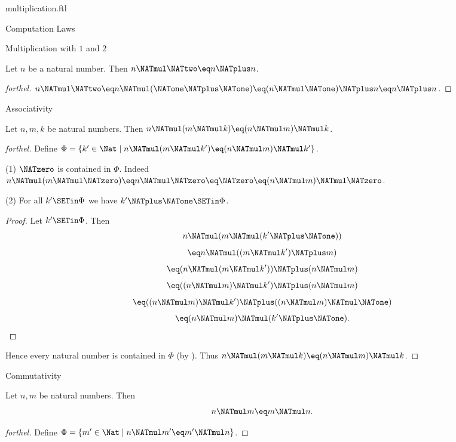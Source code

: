 \documentclass{stex}
\begin{document}
\begin{smodule}{multiplication.ftl}
\begin{sfragment}{Computation Laws}
\begin{sfragment}{Multiplication with $1$ and $2$}
    \begin{corollary}[forthel,id=ARITHMETIC_06_5679541582299136]
      Let $n$ be a natural number.
      Then $n \NATmul \NATtwo \eq n \NATplus n$.
    \end{corollary}
    \begin{proof}[forthel]
      $n \NATmul \NATtwo
        \eq n \NATmul (\NATone \NATplus \NATone)
        \eq (n \NATmul \NATone) \NATplus n
        \eq n \NATplus n$.
    \end{proof}
  \end{sfragment}

  \begin{sfragment}{Associativity}
    \begin{proposition}[forthel,id=ARITHMETIC_06_347295585402880]
      Let $n, m, k$ be natural numbers.
      Then $n \NATmul (m \NATmul k) \eq (n \NATmul m) \NATmul k$.
    \end{proposition}
    \begin{proof}[forthel]
      Define $\Phi = \{ k' \in \Nat \mid n \NATmul (m \NATmul k') \eq (n \NATmul m) \NATmul k' \}$.

      (1) $\NATzero$ is contained in $\Phi$.
      Indeed $n \NATmul (m \NATmul \NATzero)
        \eq n \NATmul \NATzero
        \eq \NATzero
        \eq (n \NATmul m) \NATmul \NATzero$.

      (2) For all $k' \SETin \Phi$ we have $k' \NATplus \NATone \SETin \Phi$.
      \begin{proof}
        Let $k' \SETin \Phi$.
        Then
        \[  n \NATmul (m \NATmul (k' \NATplus \NATone))                          \]
        \[    \eq n \NATmul ((m \NATmul k') \NATplus m)                      \]
        \[    \eq (n \NATmul (m \NATmul k')) \NATplus (n \NATmul m)            \]
        \[    \eq ((n \NATmul m) \NATmul k') \NATplus (n \NATmul m)            \]
        \[    \eq ((n \NATmul m) \NATmul k') \NATplus ((n \NATmul m) \NATmul \NATone)  \]
        \[    \eq (n \NATmul m) \NATmul (k' \NATplus \NATone).                     \]
      \end{proof}

      Hence every natural number is contained in $\Phi$ (by ).
      Thus $n \NATmul (m \NATmul k) \eq (n \NATmul m) \NATmul k$.
    \end{proof}
  \end{sfragment}

  \begin{sfragment}{Commutativity}
    \begin{proposition}[forthel,id=ARITHMETIC_06_1764759896588288]
      Let $n, m$ be natural numbers.
      Then \[ n \NATmul m \eq m \NATmul n. \]
    \end{proposition}
    \begin{proof}[forthel]
      Define $\Phi = \{ m' \in \Nat \mid n \NATmul m' \eq m' \NATmul n \}$.


\end{proof}
\end{sfragment}
\end{sfragment}
\end{smodule}
\end{document}
